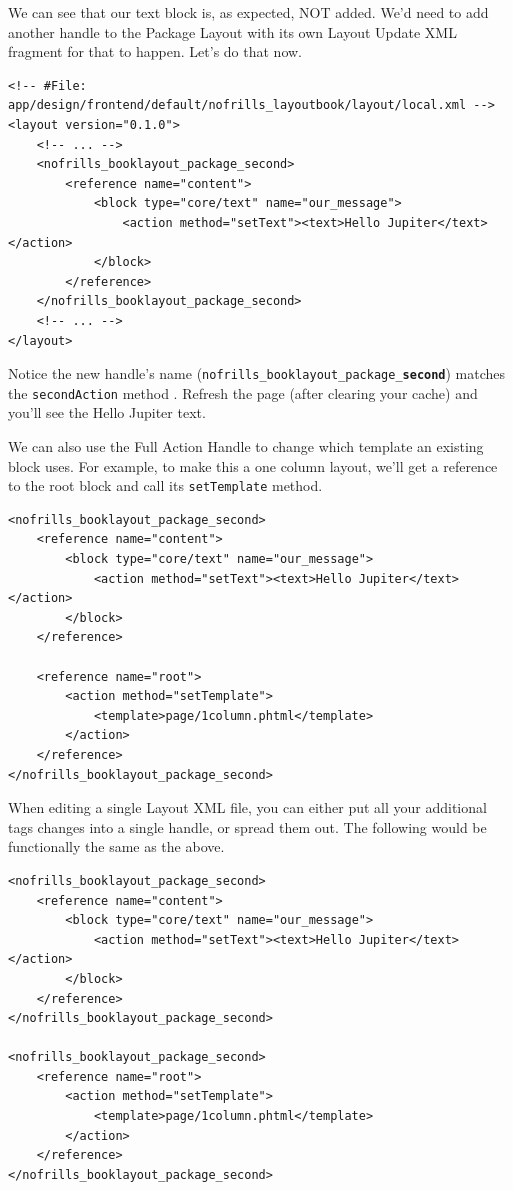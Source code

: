 \documentclass[oneside]{book}
\begin{document}
We can see that our text block is, as expected, NOT added.  We'd need to add another handle to the Package Layout with its own Layout Update XML fragment for that to happen. Let's do that now.

\begin{lstlisting}
<!-- #File: app/design/frontend/default/nofrills_layoutbook/layout/local.xml -->
<layout version="0.1.0">
    <!-- ... -->
    <nofrills_booklayout_package_second>
        <reference name="content">
            <block type="core/text" name="our_message">
                <action method="setText"><text>Hello Jupiter</text></action>
            </block>
        </reference>
    </nofrills_booklayout_package_second>
    <!-- ... -->
</layout>

\end{lstlisting}


Notice the new handle's name (\footnotesize\texttt{nofrills\_booklayout\_package\_\textbf{second}}\normalsize) matches the \footnotesize\texttt{secondAction} \normalsize  method .  Refresh the page (after clearing your cache) and you'll see the Hello Jupiter text.

We can also use the Full Action Handle to change which template an existing block uses.  For example, to make this a one column layout, we'll get a reference to the root block and call its \footnotesize\texttt{setTemplate} \normalsize  method.

\begin{lstlisting}
<nofrills_booklayout_package_second>
    <reference name="content">
        <block type="core/text" name="our_message">
            <action method="setText"><text>Hello Jupiter</text></action>
        </block>
    </reference>

    <reference name="root">
        <action method="setTemplate">
            <template>page/1column.phtml</template>
        </action>
    </reference>
</nofrills_booklayout_package_second>

\end{lstlisting}


When editing a single Layout XML file, you can either put all your additional tags changes into a single handle, or spread them out. The following would be functionally the same as the above.

\begin{lstlisting}
<nofrills_booklayout_package_second>
    <reference name="content">
        <block type="core/text" name="our_message">
            <action method="setText"><text>Hello Jupiter</text></action>
        </block>
    </reference>
</nofrills_booklayout_package_second>

<nofrills_booklayout_package_second>
    <reference name="root">
        <action method="setTemplate">
            <template>page/1column.phtml</template>
        </action>
    </reference>
</nofrills_booklayout_package_second>

\end{lstlisting}
\end{document}

